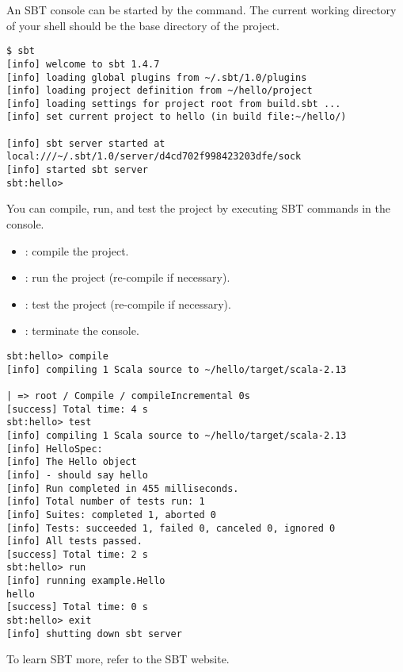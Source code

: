 An SBT console can be started by the  command. The current working
directory of your shell should be the base directory of the project.

\begin{verbatim}
$ sbt
[info] welcome to sbt 1.4.7
[info] loading global plugins from ~/.sbt/1.0/plugins
[info] loading project definition from ~/hello/project
[info] loading settings for project root from build.sbt ...
[info] set current project to hello (in build file:~/hello/)

[info] sbt server started at
local:///~/.sbt/1.0/server/d4cd702f998423203dfe/sock
[info] started sbt server
sbt:hello>
\end{verbatim}

You can compile, run, and test the project by executing SBT commands in the
console.

\begin{itemize}
  \item {}: compile the project.
  \item {}: run the project (re-compile if necessary).
  \item {}: test the project (re-compile if necessary).
  \item {}: terminate the console.
\end{itemize}

\begin{verbatim}
sbt:hello> compile
[info] compiling 1 Scala source to ~/hello/target/scala-2.13

| => root / Compile / compileIncremental 0s
[success] Total time: 4 s
sbt:hello> test
[info] compiling 1 Scala source to ~/hello/target/scala-2.13
[info] HelloSpec:
[info] The Hello object
[info] - should say hello
[info] Run completed in 455 milliseconds.
[info] Total number of tests run: 1
[info] Suites: completed 1, aborted 0
[info] Tests: succeeded 1, failed 0, canceled 0, ignored 0
[info] All tests passed.
[success] Total time: 2 s
sbt:hello> run
[info] running example.Hello
hello
[success] Total time: 0 s
sbt:hello> exit
[info] shutting down sbt server
\end{verbatim}

To learn SBT more, refer to the SBT website.
